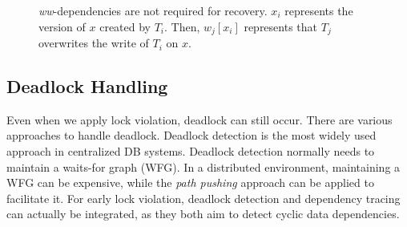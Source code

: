 \documentclass[conference]{IEEEtran}
\begin{document}
\begin{figure}[tbp]
{  }
  \caption{\emph{ww}-dependencies are not required for recovery.
  ${x_i}$ represents the version of $x$ created by ${T_i}$.
 Then, $w_j[x_i]$ represents that ${T_j}$ overwrites the write of ${T_i}$ on $x$.
}
\label{fig:versions_example}
\end{figure}


\subsection {Deadlock Handling}
\label{sec:deadlock_handling}
Even when we apply lock violation, deadlock can still occur.
There are various approaches to handle deadlock.
Deadlock detection is the most widely used approach in centralized DB systems.
Deadlock detection normally needs to maintain a waits-for graph (WFG).
In a distributed environment, maintaining a WFG can be expensive, while the \emph{path pushing} approach can be applied to facilitate it.
For early lock violation, deadlock detection and dependency tracing can actually be integrated, as they both aim to detect cyclic data dependencies.
\end{document}
